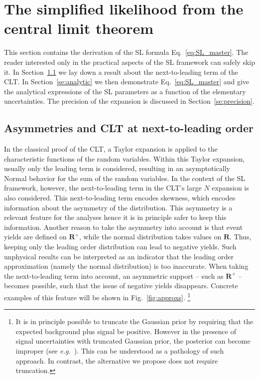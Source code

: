 \documentclass[11pt]{article}
\begin{document}
\section{The simplified likelihood from the central limit theorem}
\label{se:SL_theory}

This section contains the derivation of the SL formula Eq.~\eqref{eq:SL_master}.
The reader interested only in the practical aspects of the SL framework can safely skip it. In Section~\ref{se:skew_CLT} we lay down a  result about the next-to-leading term of the CLT. In Section~\ref{se:analytic} we then demonstrate Eq.~\eqref{eq:SL_master} and give the analytical expressions of the SL parameters as a function of the elementary uncertainties. The precision of the expansion is discussed in Section~\ref{se:precision}. 

\subsection{Asymmetries and CLT at next-to-leading order}
\label{se:skew_CLT}


In the classical proof of the CLT, a Taylor expansion is applied to the characteristic functions of the random variables.
Within this Taylor expansion, usually only the leading term is considered, resulting in an asymptotically Normal behavior for
the sum of the random variables.
In the context of the SL framework, however, the next-to-leading  term in the CLT's large $N$ expansion is also considered. 
 This next-to-leading term encodes skewness, which encodes information about the asymmetry of the distribution. This asymmetry is a relevant feature for the analyses hence it is in principle safer to keep this information. 
Another reason to take the asymmetry  into account is that event yields are defined on $\mathbf{R}^+$, while the normal distribution takes values on 
 $\mathbf{R}$. Thus, keeping only the leading order distribution can lead to negative yields.
Such unphysical results can be interpreted as an indicator that the leading order approximation (namely the normal distribution) is too inaccurate. When taking the next-to-leading term into account, an asymmetric support -- such as $\mathbf{R}^+$ --  becomes possible, such that the issue of negative yields disappears. Concrete examples of this feature will be shown in  Fig.~\ref{fig:approxs}. 
\footnote{It is in principle possible to truncate the Gaussian prior by requiring that the expected background plus signal be positive.  However in the presence of signal uncertainties with truncated Gaussian prior, the posterior can become improper   (see \textit{e.g.}~\cite{Obj_Bayes}). This can be understood as a pathology of such approach. In contrast, the alternative we propose does not require truncation. }
\end{document}
